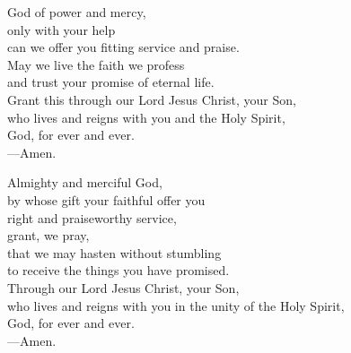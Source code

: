 \prayer


\begin{prayerverse}
God of power and mercy,\\
only with your help\\
can we offer you fitting service and praise.\\
May we live the faith we profess\\
and trust your promise of eternal life.\\
Grant this through our Lord Jesus Christ, your Son,\\
who lives and reigns with you and the Holy Spirit,\\
God, for ever and ever.\\
{\color{red}---\thinspace}Amen.
\end{prayerverse}


\begin{prayerverse}
Almighty and merciful God,\\
by whose gift your faithful offer you\\
right and praiseworthy service,\\
grant, we pray,\\
that we may hasten without stumbling\\
to receive the things you have promised.\\
Through our Lord Jesus Christ, your Son,\\
who lives and reigns with you in the unity of the Holy Spirit,\\
God, for ever and ever.\\
{\color{red}---\thinspace}Amen.
\end{prayerverse}

